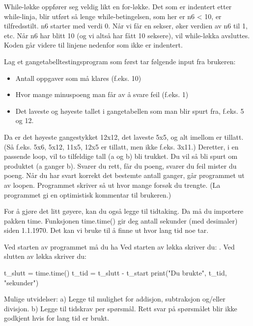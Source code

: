 While-løkke oppfører seg veldig likt en for-løkke. Det som er indentert etter while-linja, blir utført så lenge while-betingelsen, som her er n6 < 10, er tilfredsstilt. n6 starter med verdi 0. Når vi får en sekser, øker verdien av n6 til 1, etc. Når n6 har blitt 10 (og vi altså har fått 10 seksere), vil while-løkka avsluttes. Koden går videre til linjene nedenfor som ikke er indentert. 

\begin{exercise}
Lag et gangetabelltestingsprogram som først tar følgende input fra brukeren:
\begin{itemize}
\item Antall oppgaver som må klares (f.eks. 10)
\item Hvor mange minuspoeng man får av å svare feil (f.eks. 1)
\item Det laveste og høyeste tallet i gangetabellen som man blir spurt fra, f.eks. 5 og 12.
\end{itemize}
Da er det høyeste gangestykket 12x12, det laveste 5x5, og alt imellom er tillatt. (Så f.eks. 5x6, 5x12, 11x5, 12x5 er tillatt, men ikke f.eks. 3x11.) Deretter, i en passende loop, vil to tilfeldige tall (a og b) bli trukket. Du vil så bli spurt om produktet (a ganger b). Svarer du rett, får du poeng, svarer du feil mister du poeng. Når du har svart korrekt det bestemte antall ganger, går programmet ut av loopen. Programmet skriver så ut hvor mange forsøk du trengte. (La programmet gi en optimistisk kommentar til brukeren.) 
\end{exercise}

\begin{exercise}
For å gjøre det litt gøyere, kan du også legge til tidtaking. 
Da må du importere pakken time.
Funksjonen time.time() gir deg antall sekunder (med desimaler) siden 1.1.1970.
Det kan vi bruke til å finne ut hvor lang tid noe tar.

Ved starten av programmet må du ha  Ved starten av løkka skriver du: . Ved slutten av løkka skriver du:
\end{exercise}
\begin{usncodebox}
t_slutt = time.time()
t_tid = t_slutt - t_start
print("Du brukte", t_tid, "sekunder")
\end{usncodebox}

\begin{exercise}
Mulige utvidelser:
a) Legge til mulighet for addisjon, subtraksjon og/eller divisjon. 
b) Legge til tidskrav per spørsmål.
Rett svar på spørsmålet blir ikke godkjent hvis for lang tid er brukt. 
\end{exercise}

